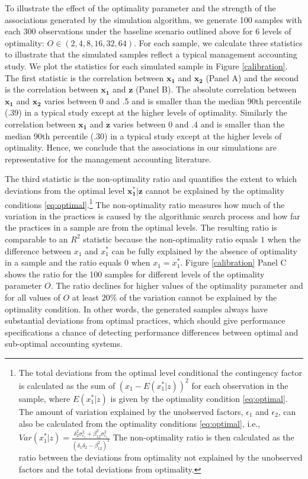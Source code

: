 \documentclass[12pt]{article}
\begin{document}
To illustrate the effect of the optimality parameter and the strength of the associations generated by the simulation algorithm, we generate 100 samples with each 300 observations under the baseline scenario outlined above for 6 levels of optimality: $O \in  (2, 4, 8, 16, 32, 64)$. For each sample, we calculate three statistics to illustrate that the simulated samples reflect a typical management accounting study. We plot the statistics for each simulated sample in Figure \ref{calibration}. The first statistic is the correlation between $\mathbf{x_1}$ and $\mathbf{x_2}$ (Panel A) and the second is the correlation between $\mathbf{x_1}$ and $\mathbf{z}$ (Panel B). The absolute correlation between $\mathbf{x_1}$ and $\mathbf{x_2}$ varies between 0 and .5 and is smaller than the median 90th percentile ($.39$) in a typical study except at the higher levels of optimality. Similarly the correlation between $\mathbf{x_1}$ and $\mathbf{z}$ varies between 0 and .4 and is smaller than the median 90th percentile (.30) in a typical study except at the higher levels of optimality. Hence, we conclude that the associations in our simulations are representative for the management accounting literature. 

The third statistic is the non-optimality ratio and quantifies the extent to which deviations from the optimal level $\mathbf{x^*_1|z}$ cannot be explained by the optimality conditions \eqref{eq:optimal}.\footnote{The total deviations from the optimal level conditional the contingency factor is calculated as the sum of $(x_1 - E(x_1^*|z))^2$ for each observation in the sample, where $E(x_1^*|z)$ is given by the optimality condition \eqref{eq:optimal}. The amount of variation explained by the unobserved factors, $\epsilon_1$ and $\epsilon_2$, can also be calculated from the optimality conditions \eqref{eq:optimal}, i.e., $Var(x_1^*|z) = \frac{\delta_2^2 \sigma_{\epsilon_1}^2 + \beta_{12}^2 \sigma_{\epsilon_1}^2}{(\delta_1 \delta_2 - \beta_{12}^2)^2}$
The non-optimality ratio is then calculated as the ratio between the deviations from optimality not explained by the unobserved factors and the total deviations from optimality.} The non-optimality ratio measures how much of the variation in the practices is caused by the algorithmic search process and how far the practices in a sample are from the optimal levels. The resulting ratio is comparable to an $R^2$ statistic because the non-optimality ratio equals $1$ when the difference between $x_1$ and $x^*_1$ can be fully explained by the absence of optimality in a sample and the ratio equals $0$ when $x_1 = x^*_1$. Figure \ref{calibration} Panel C shows the ratio for the 100 samples for different levels of the optimality parameter $O$. The ratio declines for higher values of the optimality parameter and for all values of $O$ at least $20\%$ of the variation cannot be explained by the optimality condition. In other words, the generated samples always have substantial deviations from optimal practices, which should give performance specifications a chance of detecting performance differences between optimal and sub-optimal accounting systems. 
\end{document}
